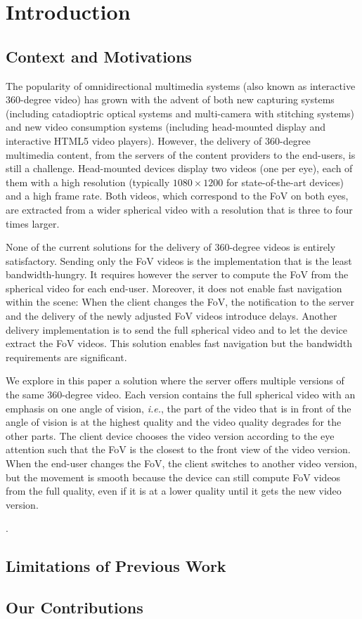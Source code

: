 \section{Introduction}
\label{sec:introduction}

\subsection{Context and Motivations}

The popularity of omnidirectional multimedia systems (also known as interactive 360-degree video) 
has grown with the advent of both new capturing systems
(including catadioptric optical systems and multi-camera with stitching systems) and new video
consumption systems (including head-mounted display and interactive HTML5 video players).
However, the delivery of 360-degree multimedia content, from the servers of the content providers
to the end-users,
is still a challenge. Head-mounted devices display two videos (one per
eye), each of them with a high resolution (typically $1080\times 1200$ for state-of-the-art devices)
and a high frame rate. Both videos, which correspond to the \ac{FoV} on both eyes, are extracted
from a wider spherical video with a resolution that is three to four times larger.

None of the current solutions for the delivery of 360-degree videos is entirely satisfactory. Sending only 
the  \ac{FoV} videos is the implementation that is the least bandwidth-hungry. It requires however the server to 
compute the \ac{FoV} from the spherical video for each end-user. Moreover, it does not enable fast
navigation within the scene: When the client changes the 
\ac{FoV}, the notification to the server and the delivery of the newly adjusted \ac{FoV} videos 
introduce delays. Another delivery implementation is to send the full spherical video and to let the device
extract the \ac{FoV} videos. This solution enables fast navigation but the bandwidth requirements are 
significant.

We explore in this paper a solution where the server offers multiple versions of the same 360-degree 
video. Each version contains the full spherical video with an emphasis on one angle of vision, \textit{i.e.},
the part of the video that is in front of the angle of vision is at the highest quality and the video quality degrades
for the other parts. The client device chooses the video version according to the eye attention such that the 
\ac{FoV} is the closest to the front view of the video version. When the end-user changes the 
\ac{FoV}, the client switches to another video version, but the movement is smooth because the device 
can still compute \ac{FoV} videos from the full quality, even if it is at a lower quality until it gets the 
new video version.

\cite{wu_enabling_2015}.

\subsection{Limitations of Previous Work}

\subsection{Our Contributions}


